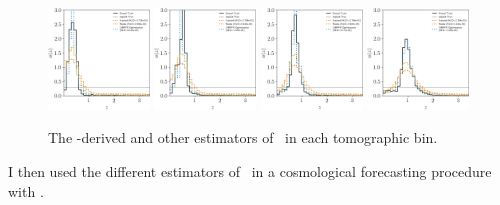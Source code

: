 \begin{figure}
	\begin{center}
		\includegraphics[width=0.24\textwidth]{figures/chippr/0single_lsst_lin_estimators.png}
		\includegraphics[width=0.24\textwidth]{figures/chippr/1single_lsst_lin_estimators.png}		\includegraphics[width=0.24\textwidth]{figures/chippr/2single_lsst_lin_estimators.png}
		\includegraphics[width=0.24\textwidth]{figures/chippr/3single_lsst_lin_estimators.png}
		\caption{The \chippr-derived and other estimators of \nz\ in each tomographic bin.
		}
	\end{center}
\end{figure}

I then used the different estimators of \nz\ in a cosmological forecasting procedure with \cosmolike.

